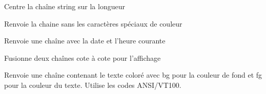 \documentclass[letterpaper,10pt,french]{sphinxmanual}
\begin{document}

\begin{fulllineitems}
\label{\detokenize{index:textutil.center}}
Centre la chaîne string sur la longueur

\end{fulllineitems}


\begin{fulllineitems}
\label{\detokenize{index:textutil.cleanLine}}
Renvoie la chaine sans les caractères spéciaux de couleur

\end{fulllineitems}


\begin{fulllineitems}
\label{\detokenize{index:textutil.dateNow}}
Renvoie une chaîne avec la date et l’heure courante

\end{fulllineitems}


\begin{fulllineitems}
\label{\detokenize{index:textutil.mergeChains}}
Fusionne deux chaînes cote à cote pour l’affichage

\end{fulllineitems}


\begin{fulllineitems}
\label{\detokenize{index:textutil.textColor}}
Renvoie une chaîne contenant le texte coloré
avec bg pour la couleur de fond
et fg pour la couleur du texte.
Utilise les codes ANSI/VT100.

\end{fulllineitems}
\end{document}
